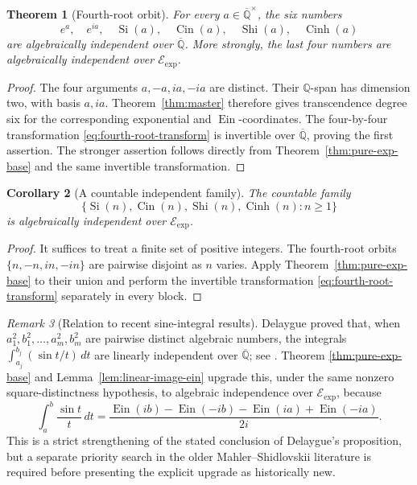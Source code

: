 \documentclass[11pt]{article}
\newtheorem{theorem}{Theorem}[section]
\newtheorem{corollary}[theorem]{Corollary}
\theoremstyle{definition}
\theoremstyle{remark}
\newtheorem{remark}[theorem]{Remark}
\newcommand{\Q}{\mathbb Q}
\newcommand{\Qbar}{\overline{\mathbb Q}}
\newcommand{\Ein}{\operatorname{Ein}}
\newcommand{\Cin}{\operatorname{Cin}}
\newcommand{\Eexp}{\mathcal E_{\mathrm{exp}}}
\newcommand{\Si}{\operatorname{Si}}
\newcommand{\Shi}{\operatorname{Shi}}
\newcommand{\Cinh}{\operatorname{Cinh}}
\begin{document}
\begin{theorem}[Fourth-root orbit]\label{thm:fourth-root-orbit}
For every \(a\in\Qbar^\times\), the six numbers
\begin{equation}\label{eq:six-orbit-values}
 e^a,\quad e^{ia},\quad
 \Si(a),\quad\Cin(a),\quad\Shi(a),\quad\Cinh(a)
\end{equation}
are algebraically independent over \(\Qbar\).  More strongly, the last four
numbers are algebraically independent over \(\Eexp\).
\end{theorem}

\begin{proof}
The four arguments \(a,-a,ia,-ia\) are distinct.  Their \(\Q\)-span has
dimension two, with basis \(a,ia\).  Theorem~\ref{thm:master} therefore
gives transcendence degree six for the corresponding exponential and
\(\Ein\)-coordinates.  The four-by-four transformation
\eqref{eq:fourth-root-transform} is invertible over \(\Qbar\), proving the
first assertion.  The stronger assertion follows directly from
Theorem~\ref{thm:pure-exp-base} and the same invertible transformation.
\end{proof}

\begin{corollary}[A countable independent family]
\label{cor:integer-integral-family}
The countable family
\begin{equation}\label{eq:integer-integral-family}
 \bigl\{\Si(n),\Cin(n),\Shi(n),\Cinh(n):n\ge1\bigr\}
\end{equation}
is algebraically independent over \(\Eexp\).
\end{corollary}

\begin{proof}
It suffices to treat a finite set of positive integers.  The fourth-root
orbits \(\{n,-n,in,-in\}\) are pairwise disjoint as \(n\) varies.  Apply
Theorem~\ref{thm:pure-exp-base} to their union and perform the invertible
transformation \eqref{eq:fourth-root-transform} separately in every block.
\end{proof}

\begin{remark}[Relation to recent sine-integral results]
Delaygue proved that, when
\(a_1^2,b_1^2,\ldots,a_m^2,b_m^2\) are pairwise distinct algebraic
numbers, the integrals
\(\int_{a_j}^{b_j}(\sin t/t)\,dt\) are linearly independent over
\(\Qbar\); see \cite[Proposition~4.4]{Delaygue2025}.  Theorem
\ref{thm:pure-exp-base} and Lemma~\ref{lem:linear-image-ein} upgrade this,
under the same nonzero square-distinctness hypothesis, to algebraic
independence over \(\Eexp\), because
\[
 \int_a^b\frac{\sin t}{t}\,dt
 =\frac{\Ein(ib)-\Ein(-ib)-\Ein(ia)+\Ein(-ia)}{2i}.
\]
This is a strict strengthening of the stated conclusion of Delaygue's
proposition, but a separate priority search in the older
Mahler--Shidlovskii literature is required before presenting the explicit
upgrade as historically new.
\end{remark}
\end{document}
